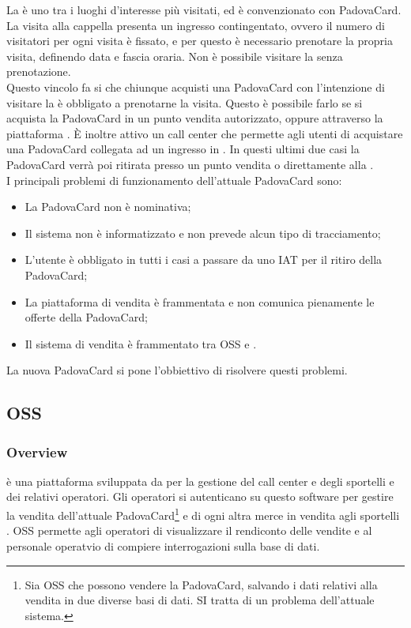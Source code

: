 \label{cappella}
La \cappella è uno tra i luoghi d'interesse più visitati, ed è convenzionato con PadovaCard. La visita alla cappella presenta un ingresso contingentato, ovvero il numero di visitatori per ogni visita è fissato, e per questo è necessario prenotare la propria visita, definendo data e fascia oraria. Non è possibile visitare la \cappella senza prenotazione. \\

Questo vincolo fa si che chiunque acquisti una PadovaCard con l'intenzione di visitare la \cappella è obbligato a prenotarne la visita. Questo è possibile farlo se si acquista la PadovaCard in un punto vendita autorizzato, oppure attraverso la piattaforma \vivaticket.
\`E inoltre attivo un call center che permette agli utenti di acquistare una PadovaCard collegata ad un ingresso in \cappella.
In questi ultimi due casi la PadovaCard verrà poi ritirata presso un punto vendita o direttamente alla \cappella.\\

I principali problemi di funzionamento dell'attuale PadovaCard sono:
\begin{itemize}
\item La PadovaCard non è nominativa;
\item Il sistema non è informatizzato e non prevede alcun tipo di tracciamento;
\item L'utente è obbligato in tutti i casi a passare da uno IAT per il ritiro della PadovaCard;
\item La piattaforma di vendita è frammentata e non comunica pienamente le offerte della PadovaCard;
\item Il sistema di vendita è frammentato tra OSS e \tlite.
\end{itemize}

La nuova PadovaCard si pone l'obbiettivo di risolvere questi problemi.



\subsection{OSS}\label{oss}
\subsubsection{Overview}
 è una piattaforma sviluppata da \net per la gestione del call center e degli sportelli  e dei relativi operatori.
Gli operatori si autenticano su questo software per gestire la vendita dell'attuale PadovaCard\footnote{Sia OSS che \tlite possono vendere la PadovaCard, salvando i dati relativi alla vendita in due diverse basi di dati. SI tratta di un problema dell'attuale sistema.} e di ogni altra merce in vendita agli sportelli . 
OSS permette agli operatori di visualizzare il rendiconto delle vendite e al personale operatvio di compiere interrogazioni sulla base di dati.

